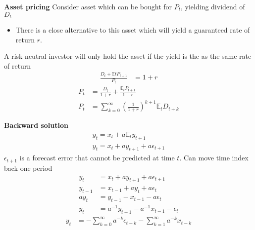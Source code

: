 \documentclass{beamer}
\begin{document}
\begin{frame}
  \textbf{Asset pricing}
  Consider asset which can be bought for $P_t$, yielding dividend of $D_t$
  \begin{itemize}
    \item There is a close alternative to this asset which will yield a guaranteed rate of return $r$. 
  \end{itemize}
  A risk neutral investor will only hold the asset if the yield is the as the same rate of return
\begin{align}  
  \frac{D_t + \mathbb{E}tP_{t+1}}{P_t}&=1+r  
\end{align}
\medskip
\begin{align}
  P_t&= \frac{D_t}{1+r} + \frac{\mathbb{E}_tP_{t+1}}{1+r}\\ \nonumber
  P_t&= \sum^{\infty}_{k=0}\left(\frac{1}{1+r}\right)^{k+1}\mathbb{E}_tD_{t+k}   
\end{align}
\end{frame}

\begin{frame}
  \textbf{Backward solution}  
 \begin{align}
    y_t=x_t + a\mathbb{E}_ty_{t+1} \\ \nonumber
    y_t= x_t + ay_{t+1} + a\epsilon_{t+1}
 \end{align}
  $\epsilon_{t+1}$ is a forecast error that cannot be predicted at time $t$. 
  Can move time index back one period
  \begin{align}
  y_t &= x_t + ay_{t+1} + a\epsilon_{t+1}\\ \nonumber
  y_{t-1} &= x_{t-1} + ay_t + a\epsilon_t\\ \nonumber
  ay_t &= y_{t-1} - x_{t-1} - a\epsilon_t\\ \nonumber
  y_t &= a^{-1}y_{t-1} - a^{-1}x_{t-1} - \epsilon_t 
\end{align}
\begin{align}
  y_t&= -\sum^{\infty}_{k=0}a^{-k}\epsilon_{t-k}-\sum^{\infty}_{k=1}a^{-k}x_{t-k}
\end{align}
\end{frame}
\end{document}
